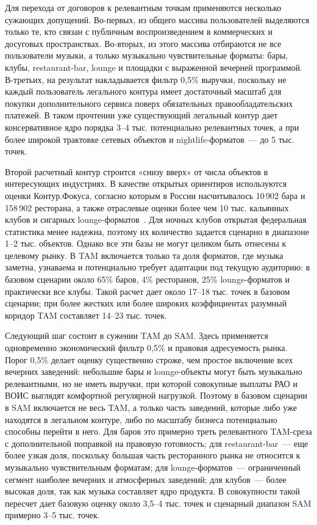 Для перехода от договоров к релевантным точкам применяются несколько сужающих допущений. Во-первых, из общего массива пользователей выделяются только те, кто связан с публичным воспроизведением в коммерческих и досуговых пространствах. Во-вторых, из этого массива отбираются не все пользователи музыки, а только музыкально чувствительные форматы: бары, клубы, restaurant-bar, lounge и площадки с выраженной вечерней программой. В-третьих, на результат накладывается фильтр 0{,}5\% выручки, поскольку не каждый пользователь легального контура имеет достаточный масштаб для покупки дополнительного сервиса поверх обязательных правообладательских платежей. В таком прочтении уже существующий легальный контур дает консервативное ядро порядка 3--4 тыс. потенциально релевантных точек, а при более широкой трактовке сетевых объектов и nightlife-форматов~--- до 5 тыс. точек.

Второй расчетный контур строится «снизу вверх» от числа объектов в интересующих индустриях. В качестве открытых ориентиров используются оценки Контур.Фокуса, согласно которым в России насчитывалось 10\,902 бара и 158\,902 ресторана, а также отраслевые оценки более чем 10 тыс. кальянных клубов и сигарных lounge-форматов~\cite{kontur_foodservice_2025,retail_hookah_lounge_2026}. Для ночных клубов открытая федеральная статистика менее надежна, поэтому их количество задается сценарно в диапазоне 1--2 тыс. объектов. Однако все эти базы не могут целиком быть отнесены к целевому рынку. В TAM включается только та доля форматов, где музыка заметна, узнаваема и потенциально требует адаптации под текущую аудиторию: в базовом сценарии около 65\% баров, 4\% ресторанов, 25\% lounge-форматов и практически все клубы. Такой расчет дает около 17--18 тыс. точек в базовом сценарии; при более жестких или более широких коэффициентах разумный коридор TAM составляет 14--23 тыс. точек.

Следующий шаг состоит в сужении TAM до SAM. Здесь применяется одновременно экономический фильтр 0{,}5\% и правовая адресуемость рынка. Порог 0{,}5\% делает оценку существенно строже, чем простое включение всех вечерних заведений: небольшие бары и lounge-объекты могут быть музыкально релевантными, но не иметь выручки, при которой совокупные выплаты РАО и ВОИС выглядят комфортной регулярной нагрузкой. Поэтому в базовом сценарии в SAM включается не весь TAM, а только часть заведений, которые либо уже находятся в легальном контуре, либо по масштабу бизнеса потенциально способны перейти в него. Для баров это примерно треть релевантного TAM-среза с дополнительной поправкой на правовую готовность; для restaurant-bar~--- еще более узкая доля, поскольку большая часть ресторанного рынка не относится к музыкально чувствительным форматам; для lounge-форматов~--- ограниченный сегмент наиболее вечерних и атмосферных заведений; для клубов~--- более высокая доля, так как музыка составляет ядро продукта. В совокупности такой пересчет дает базовую оценку около 3{,}5--4 тыс. точек и сценарный диапазон SAM примерно 3--5 тыс. точек.


